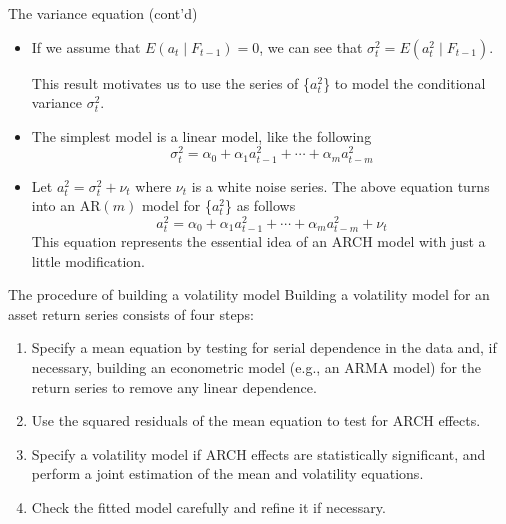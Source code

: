 \documentclass[presentation,10pt]{beamer}
\begin{document}
\begin{frame}[label={sec:org8d503cf}]{The variance equation (cont'd)}
\begin{itemize}
\item If we assume that \(E(a_t \mid F_{t-1}) = 0\), we can see that
\(\sigma^2_t = E(a^2_t \mid F_{t-1})\). 

\vspace{0.3cm}

This result motivates us to use
the series of \{\(a^2_t\)\} to model the conditional variance
\(\sigma^2_t\).

\item The simplest model is a linear model, like the following
\[ \sigma^2_t = \alpha_0 + \alpha_1 a^2_{t-1} + \cdots + \alpha_m a^2_{t-m} \]

\item Let \(a^2_t = \sigma^2_t + \nu_t\) where \(\nu_t\) is a white noise
series. The above equation turns into an AR\((m)\) model for \{\(a^2_t\)\}
as follows
\[a^2_t = \alpha_0 + \alpha_1 a^2_{t-1} + \cdots + \alpha_m
  a^2_{t-m} + \nu_t \]
This equation represents the essential idea of an ARCH model with just
a little modification.
\end{itemize}
\end{frame}

\begin{frame}[label={sec:org2ce6672}]{The procedure of building a volatility model}
Building a volatility model for an asset return series consists of
four steps:

\begin{enumerate}
\item Specify a mean equation by testing for serial dependence in the
data and, if necessary, building an econometric model (e.g., an
ARMA model) for the return series to remove any linear dependence.

\item Use the squared residuals of the mean equation to test for ARCH
effects.

\item Specify a volatility model if ARCH effects are statistically
significant, and perform a joint estimation of the mean and
volatility equations.

\item Check the fitted model carefully and refine it if necessary.
\end{enumerate}
\end{frame}
\end{document}
